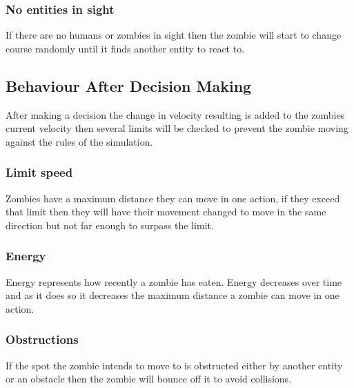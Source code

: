 \subsubsection{No entities in sight}
If there are no humans or zombies in sight then the zombie will start to change course randomly until it finds another entity to react to.

\subsection{Behaviour After Decision Making}
After making a decision the change in velocity resulting is added to the zombies current velocity then several limits will be checked to prevent the zombie moving against the rules of the simulation.

\subsubsection{Limit speed}
Zombies have a maximum distance they can move in one action, if they exceed that limit then they will have their movement changed to move in the same direction but not far enough to surpass the limit.

\subsubsection{Energy}
Energy represents how recently a zombie has eaten. Energy decreases over time and as it does so it decreases the maximum distance a zombie can move in one action.  

\subsubsection{Obstructions}
If the spot the zombie intends to move to is obstructed either by another entity or an obstacle then the zombie will bounce off it to avoid collisions.
\clearpage
\endinput
 
